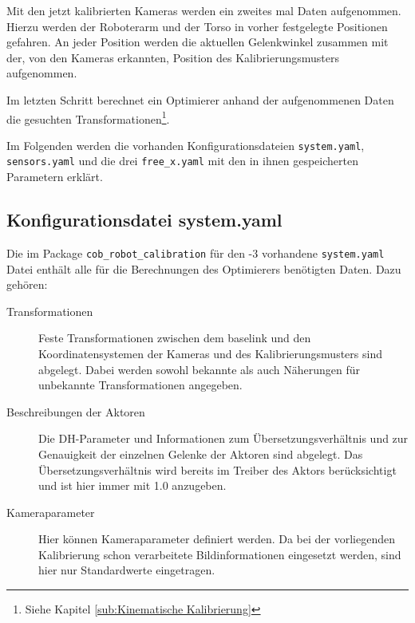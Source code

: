 Mit den jetzt kalibrierten Kameras werden ein zweites mal Daten aufgenommen.
Hierzu werden der Roboterarm und der Torso in vorher festgelegte Positionen
gefahren. An jeder Position werden die aktuellen Gelenkwinkel zusammen mit der,
von den Kameras erkannten, Position des Kalibrierungsmusters aufgenommen.

Im letzten Schritt berechnet ein Optimierer anhand der aufgenommenen Daten die
gesuchten Transformationen\footnote{Siehe Kapitel 
  \ref{sub:Kinematische Kalibrierung}}.\cite{Haug2012}



  Im Folgenden werden die vorhanden Konfigurationsdateien \texttt{system.yaml},\break
  \texttt{sensors.yaml} und die drei \texttt{free\_x.yaml} mit den in ihnen
gespeicherten Parametern erklärt.



\subsection{Konfigurationsdatei system.yaml}

Die im Package \texttt{cob\_robot\_calibration}
    für den -3 vorhandene \texttt{system.yaml} Datei enthält alle für die
    Berechnungen des Optimierers benötigten Daten. Dazu gehören:

    \begin{description}

      \item[Transformationen] Feste Transformationen zwischen
        dem \ac{baselink} und den Koordinatensystemen der Kameras und des
        Kalibrierungsmusters sind abgelegt. Dabei werden sowohl bekannte als auch Näherungen
	für unbekannte Transformationen angegeben.

      \item[Beschreibungen der Aktoren] 
        Die \acl{DH-Parameter} und Informationen zum Übersetzungsverhältnis und
        zur Genauigkeit der einzelnen Gelenke der Aktoren sind abgelegt.
        Das Übersetzungsverhältnis wird
        bereits im Treiber des Aktors berücksichtigt und ist hier immer mit 1.0
        anzugeben.

      \item[Kameraparameter] Hier können Kameraparameter definiert werden. Da
        bei der vorliegenden Kalibrierung schon verarbeitete
        Bildinformationen eingesetzt werden, sind hier nur Standardwerte
        eingetragen.

    \end{description}

